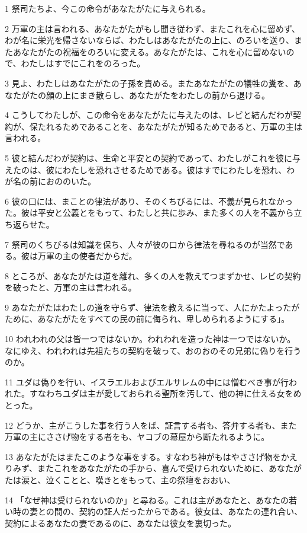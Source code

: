 \par 1 祭司たちよ、今この命令があなたがたに与えられる。
\par 2 万軍の主は言われる、あなたがたがもし聞き従わず、またこれを心に留めず、わが名に栄光を帰さないならば、わたしはあなたがたの上に、のろいを送り、またあなたがたの祝福をのろいに変える。あなたがたは、これを心に留めないので、わたしはすでにこれをのろった。
\par 3 見よ、わたしはあなたがたの子孫を責める。またあなたがたの犠牲の糞を、あなたがたの顔の上にまき散らし、あなたがたをわたしの前から退ける。
\par 4 こうしてわたしが、この命令をあなたがたに与えたのは、レビと結んだわが契約が、保たれるためであることを、あなたがたが知るためであると、万軍の主は言われる。
\par 5 彼と結んだわが契約は、生命と平安との契約であって、わたしがこれを彼に与えたのは、彼にわたしを恐れさせるためである。彼はすでにわたしを恐れ、わが名の前におののいた。
\par 6 彼の口には、まことの律法があり、そのくちびるには、不義が見られなかった。彼は平安と公義とをもって、わたしと共に歩み、また多くの人を不義から立ち返らせた。
\par 7 祭司のくちびるは知識を保ち、人々が彼の口から律法を尋ねるのが当然である。彼は万軍の主の使者だからだ。
\par 8 ところが、あなたがたは道を離れ、多くの人を教えてつまずかせ、レビの契約を破ったと、万軍の主は言われる。
\par 9 あなたがたはわたしの道を守らず、律法を教えるに当って、人にかたよったがために、あなたがたをすべての民の前に侮られ、卑しめられるようにする」。
\par 10 われわれの父は皆一つではないか。われわれを造った神は一つではないか。なにゆえ、われわれは先祖たちの契約を破って、おのおのその兄弟に偽りを行うのか。
\par 11 ユダは偽りを行い、イスラエルおよびエルサレムの中には憎むべき事が行われた。すなわちユダは主が愛しておられる聖所を汚して、他の神に仕える女をめとった。
\par 12 どうか、主がこうした事を行う人をば、証言する者も、答弁する者も、また万軍の主にささげ物をする者をも、ヤコブの幕屋から断たれるように。
\par 13 あなたがたはまたこのような事をする。すなわち神がもはやささげ物をかえりみず、またこれをあなたがたの手から、喜んで受けられないために、あなたがたは涙と、泣くことと、嘆きとをもって、主の祭壇をおおい、
\par 14 「なぜ神は受けられないのか」と尋ねる。これは主があなたと、あなたの若い時の妻との間の、契約の証人だったからである。彼女は、あなたの連れ合い、契約によるあなたの妻であるのに、あなたは彼女を裏切った。
